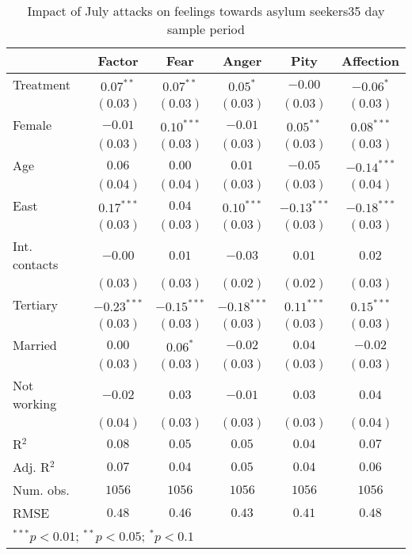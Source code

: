 
\begin{table}
\caption{Impact of July attacks on feelings towards asylum seekers35 day sample period}
\begin{center}
\begin{tabular}{l c c c c c}
\toprule
 & Factor & Fear & Anger & Pity & Affection \\
\midrule
Treatment     & $0.07^{**}$   & $0.07^{**}$   & $0.05^{*}$    & $-0.00$       & $-0.06^{*}$   \\
              & $(0.03)$      & $(0.03)$      & $(0.03)$      & $(0.03)$      & $(0.03)$      \\
Female        & $-0.01$       & $0.10^{***}$  & $-0.01$       & $0.05^{**}$   & $0.08^{***}$  \\
              & $(0.03)$      & $(0.03)$      & $(0.03)$      & $(0.03)$      & $(0.03)$      \\
Age           & $0.06$        & $0.00$        & $0.01$        & $-0.05$       & $-0.14^{***}$ \\
              & $(0.04)$      & $(0.04)$      & $(0.03)$      & $(0.03)$      & $(0.04)$      \\
East          & $0.17^{***}$  & $0.04$        & $0.10^{***}$  & $-0.13^{***}$ & $-0.18^{***}$ \\
              & $(0.03)$      & $(0.03)$      & $(0.03)$      & $(0.03)$      & $(0.03)$      \\
Int. contacts & $-0.00$       & $0.01$        & $-0.03$       & $0.01$        & $0.02$        \\
              & $(0.03)$      & $(0.03)$      & $(0.02)$      & $(0.02)$      & $(0.03)$      \\
Tertiary      & $-0.23^{***}$ & $-0.15^{***}$ & $-0.18^{***}$ & $0.11^{***}$  & $0.15^{***}$  \\
              & $(0.03)$      & $(0.03)$      & $(0.03)$      & $(0.03)$      & $(0.03)$      \\
Married       & $0.00$        & $0.06^{*}$    & $-0.02$       & $0.04$        & $-0.02$       \\
              & $(0.03)$      & $(0.03)$      & $(0.03)$      & $(0.03)$      & $(0.03)$      \\
Not working   & $-0.02$       & $0.03$        & $-0.01$       & $0.03$        & $0.04$        \\
              & $(0.04)$      & $(0.03)$      & $(0.03)$      & $(0.03)$      & $(0.04)$      \\
\midrule
R$^2$         & $0.08$        & $0.05$        & $0.05$        & $0.04$        & $0.07$        \\
Adj. R$^2$    & $0.07$        & $0.04$        & $0.05$        & $0.04$        & $0.06$        \\
Num. obs.     & $1056$        & $1056$        & $1056$        & $1056$        & $1056$        \\
RMSE          & $0.48$        & $0.46$        & $0.43$        & $0.41$        & $0.48$        \\
\bottomrule
\multicolumn{6}{l}{\scriptsize{$^{***}p<0.01$; $^{**}p<0.05$; $^{*}p<0.1$}}
\end{tabular}
\label{tab_emo_35}
\end{center}
\end{table}
